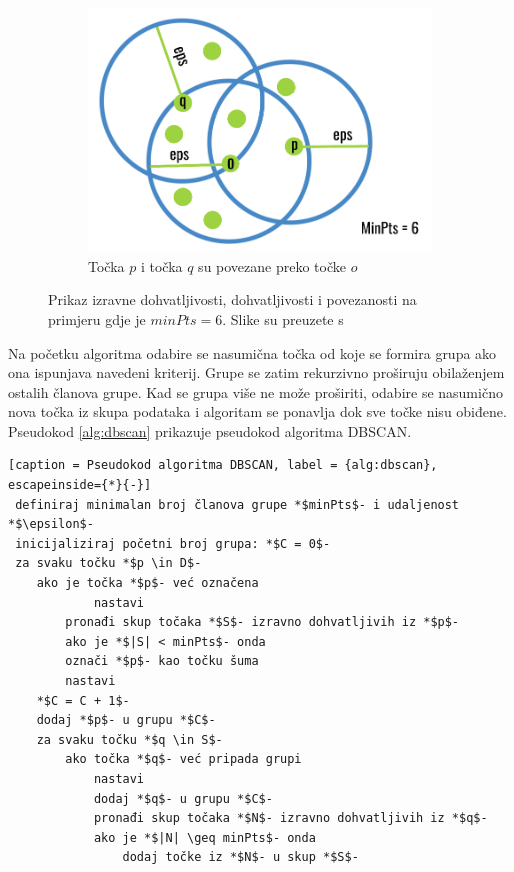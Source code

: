 \documentclass[utf8, diplomski, numeric]{fer}
\begin{document}
\begin{figure}[htp]
\begin{subfigure}{.3\textwidth}
\centering
\includegraphics[width=1\textwidth]{images/dbscan3.png}
\caption{Točka $p$ i točka $q$ su povezane preko točke $o$}
\end{subfigure}
\caption{Prikaz izravne dohvatljivosti, dohvatljivosti i povezanosti na primjeru gdje je $minPts = 6$. Slike su preuzete s \cite{DBSCANReachability}}
\label{fig:dbscan-dohvatljivost}
\end{figure}

Na početku algoritma odabire se nasumična točka od koje se formira grupa ako ona ispunjava navedeni kriterij. Grupe se zatim rekurzivno proširuju obilaženjem ostalih članova grupe. Kad se grupa više ne može proširiti, odabire se nasumično nova točka iz skupa podataka i algoritam se ponavlja dok sve točke nisu obiđene. Pseudokod \ref{alg:dbscan} prikazuje pseudokod algoritma DBSCAN.

\begin{lstlisting}[caption = Pseudokod algoritma DBSCAN, label = {alg:dbscan}, escapeinside={*}{-}]
 definiraj minimalan broj članova grupe *$minPts$- i udaljenost *$\epsilon$-
 inicijaliziraj početni broj grupa: *$C = 0$-
 za svaku točku *$p \in D$-
 	ako je točka *$p$- već označena
       		nastavi
    	pronađi skup točaka *$S$- izravno dohvatljivih iz *$p$-
    	ako je *$|S| < minPts$- onda 
 		označi *$p$- kao točku šuma
 	   	nastavi
 	*$C = C + 1$-
 	dodaj *$p$- u grupu *$C$-
	za svaku točku *$q \in S$-
	  	ako točka *$q$- već pripada grupi
	  		nastavi
	      	dodaj *$q$- u grupu *$C$-
	      	pronađi skup točaka *$N$- izravno dohvatljivih iz *$q$-
	      	ako je *$|N| \geq minPts$- onda 
	         	dodaj točke iz *$N$- u skup *$S$-

\end{lstlisting}
\end{document}
